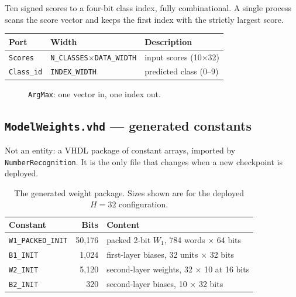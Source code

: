 \documentclass[11pt,a4paper]{article}
\begin{document}
Ten signed scores to a four-bit class index, fully combinational. A single
process scans the score vector and keeps the first index with the strictly
largest score.

\begin{center}
\small
\begin{tabularx}{\linewidth}{@{}llL@{}}
\toprule
\textbf{Port} & \textbf{Width} & \textbf{Description} \\
\midrule
\texttt{Scores}   & \texttt{N\_CLASSES}$\times$\texttt{DATA\_WIDTH} & input scores (10$\times$32) \\
\texttt{Class\_id}& \texttt{INDEX\_WIDTH} & predicted class (0--9) \\
\bottomrule
\end{tabularx}
\end{center}

\begin{figure}[H]
\centering
{}
\caption{\texttt{ArgMax}: one vector in, one index out.}
\label{fig:argmax}
\end{figure}

\subsection{\texttt{ModelWeights.vhd} --- generated constants}
\label{sub:modelweights}

Not an entity: a VHDL package of constant arrays, imported by
\texttt{NumberRecognition}. It is the only file that changes when a new
checkpoint is deployed.

\begin{table}[H]
\centering
\small
\caption{The generated weight package. Sizes shown are for the deployed
  $H{=}32$ configuration.}
\label{tab:weights}
\begin{tabularx}{\linewidth}{@{}lrL@{}}
\toprule
\textbf{Constant} & \textbf{Bits} & \textbf{Content} \\
\midrule
\texttt{W1\_PACKED\_INIT} & 50{,}176 & packed 2-bit $W_1$, 784 words $\times$ 64 bits \\
\texttt{B1\_INIT}         & 1{,}024 & first-layer biases, 32 units $\times$ 32 bits \\
\texttt{W2\_INIT}         &   5{,}120 & second-layer weights, 32 $\times$ 10 at 16 bits \\
\texttt{B2\_INIT}         &     320 & second-layer biases, 10 $\times$ 32 bits \\
\bottomrule
\end{tabularx}
\end{table}
\end{document}
